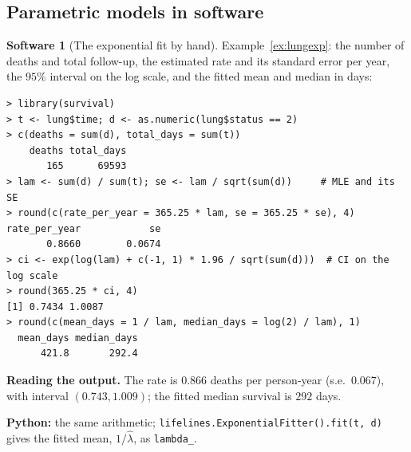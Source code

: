 \documentclass[11pt,a4paper]{article}
\numberwithin{equation}{section}
\theoremstyle{definition}
\newtheorem{software}[thm]{Software}
\begin{document}
\subsection{Parametric models in software}
\label{ssec:software3}

\begin{software}[The exponential fit by hand]
\label{sw:expfit}
Example~\ref{ex:lungexp}: the number of deaths and total follow-up, the estimated rate and its standard error per year, the $95\%$ interval on the log scale, and the fitted mean and median in days:
{\small\begin{verbatim}
> library(survival)
> t <- lung$time; d <- as.numeric(lung$status == 2)
> c(deaths = sum(d), total_days = sum(t))
    deaths total_days 
       165      69593 
> lam <- sum(d) / sum(t); se <- lam / sqrt(sum(d))     # MLE and its SE
> round(c(rate_per_year = 365.25 * lam, se = 365.25 * se), 4)
rate_per_year            se 
       0.8660        0.0674 
> ci <- exp(log(lam) + c(-1, 1) * 1.96 / sqrt(sum(d)))  # CI on the log scale
> round(365.25 * ci, 4)
[1] 0.7434 1.0087
> round(c(mean_days = 1 / lam, median_days = log(2) / lam), 1)
  mean_days median_days 
      421.8       292.4 
\end{verbatim}}
\textbf{Reading the output.} The rate is $0.866$ deaths per person-year (s.e.~$0.067$), with interval $(0.743, 1.009)$; the fitted median survival is $292$ days.

\textbf{Python:} the same arithmetic; \texttt{lifelines.ExponentialFitter().fit(t, d)} gives the fitted mean, $1/\hat\lambda$, as \texttt{lambda\_}.
\end{software}
\end{document}
